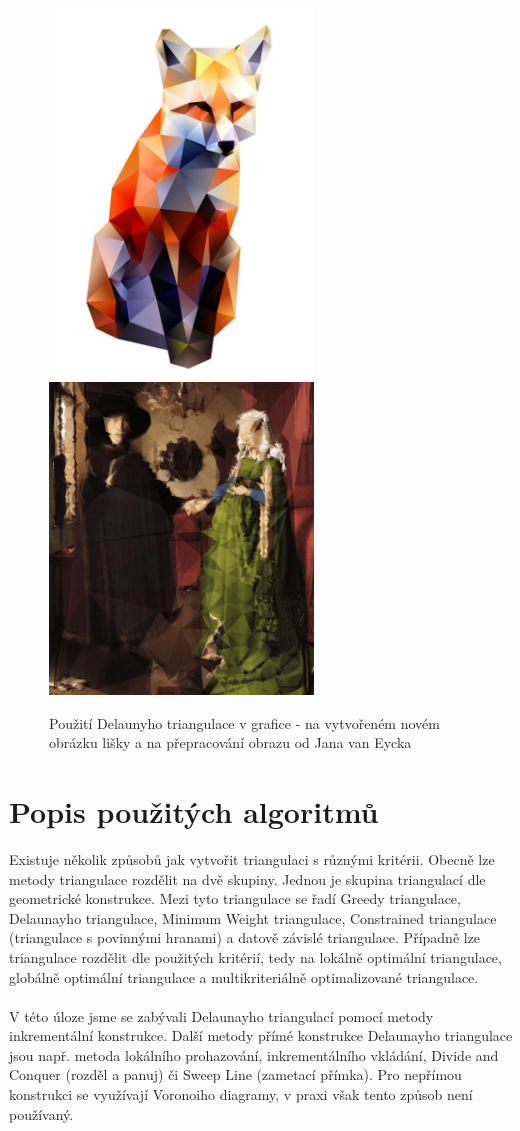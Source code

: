 \documentclass[a4paper, 12pt]{article}
\begin{document}
\begin{figure}[h!]
\centering
\includegraphics[width=7cm]{pictures/liska.jpg}
\includegraphics[width=7cm]{pictures/jan_van_eyck.png}
\caption{Použití Delaunyho triangulace v grafice - na vytvořeném novém obrázku lišky a na přepracování obrazu od Jana van Eycka}
\end{figure}

\section{Popis použitých algoritmů}
Existuje několik způsobů jak vytvořit triangulaci s různými kritérii. Obecně lze metody triangulace rozdělit na dvě skupiny. Jednou je skupina triangulací dle geometrické konstrukce. Mezi tyto triangulace se řadí Greedy triangulace, Delaunayho triangulace, Minimum Weight triangulace, Constrained triangulace (triangulace s povinnými hranami) a datově závislé triangulace. Případně lze triangulace rozdělit dle použitých kritérií, tedy na lokálně optimální triangulace, globálně optimální triangulace a multikriteriálně optimalizované triangulace. \\
\\
V této úloze jsme se zabývali Delaunayho triangulací pomocí metody inkrementální konstrukce. Další metody přímé konstrukce Delaunayho triangulace jsou např. metoda lokálního prohazování, inkrementálního vkládání, Divide and Conquer (rozděl a panuj) či Sweep Line (zametací přímka). Pro nepřímou konstrukci se využívají Voronoiho diagramy, v praxi však tento způsob není používaný. 
\end{document}
